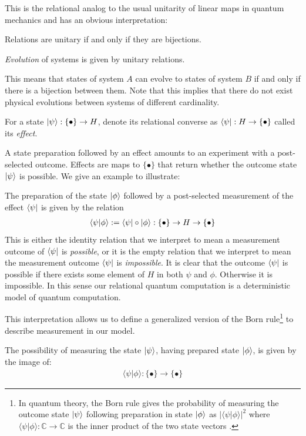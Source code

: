 \noindent This is the relational analog to the usual unitarity of linear maps in quantum mechanics and has an obvious interpretation:

\begin{corollary}
\label{cor:bijections}
Relations are unitary if and only if they are bijections.
\end{corollary}

\begin{axiom}
\emph{Evolution} of systems is given by unitary relations.
\end{axiom}

\noindent This means that states of system $A$ can evolve to states of system $B$ if and only if there is a bijection between them. Note that this implies that there do not exist physical evolutions between systems of different cardinality. %

\begin{defn}
For a state $| \psi \rangle:\{\bullet\}\to H$, denote its relational converse as $\langle \psi |:H\to\{\bullet\}$ called its \emph{effect}.
\end{defn}

\noindent A state preparation followed by an effect amounts to an experiment with a post-selected outcome. Effects are maps to $\{\bullet\}$ that return whether the outcome state $| \psi \rangle$ is possible.
 We give an example to illustrate:
\begin{example}
The preparation of the state $| \phi \rangle$ followed by a post-selected measurement of the effect $\langle \psi |$ is given by the relation
\begin{align*}
\langle\psi|\phi\rangle:=\langle \psi |\circ| \phi \rangle:\{\bullet\}\to H\to \{\bullet\}
\end{align*}
This is either the identity relation that we interpret to mean a measurement outcome of $\langle \psi |$ is \emph{possible}, or it is the empty relation that we interpret to mean the measurement outcome $\langle \psi |$ is \emph{impossible}. It is clear that the outcome $\langle \psi |$ is possible if there exists some element of $H$ in both $\psi$ and $\phi$. Otherwise it is impossible.
In this sense our relational quantum computation is a deterministic model of quantum computation.
\end{example}

This interpretation allows us to define a generalized version of the Born rule\footnote{In quantum theory, the Born rule gives the probability of measuring the outcome state $| \psi \rangle$ following preparation in state $| \phi \rangle$ as $|\langle\psi|\phi\rangle|^2$ where $\langle\psi|\phi\rangle:\mathbb{C}\to\mathbb{C}$ is the inner product of the two state vectors \cite{nielsen2010quantum}.} to describe measurement in our model.
\begin{axiom}
The possibility of measuring the state $| \psi \rangle$, having prepared state $| \phi \rangle$, is given by the image of:
\begin{align}
\langle\psi|\phi\rangle:\{\bullet\}\to\{\bullet\}
\end{align}
\end{axiom}

